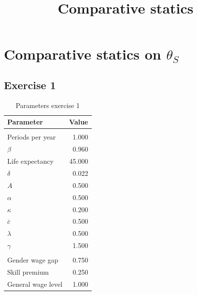 \documentclass[12pt]{article}
\begin{document}
\title{Comparative statics}
\maketitle

\section{Comparative statics on $\theta_S$}

\subsection{Exercise 1}

\begin{table}[htbp]
	\centering
	\caption{Parameters exercise 1}
	\begin{tabular}{lr}
		\toprule
		Parameter & \multicolumn{1}{l}{Value} \\
		\midrule
		&  \\
		Periods per year & 1.000 \\
		$\beta$ & 0.960 \\
		Life expectancy & 45.000 \\
		$\delta$ & 0.022 \\
		$A$ & 0.500 \\
		$\alpha$ & 0.500 \\
		$\kappa$ & 0.200 \\
		$\bar {c}$ & 0.500 \\
		$\lambda$ & 0.500 \\
		$\gamma$ & 1.500 \\
		&  \\
		Gender wage gap & 0.750 \\
		Skill premium & 0.250 \\
		General wage level & 1.000 \\
		\bottomrule
	\end{tabular}
\end{table}
\end{document}
